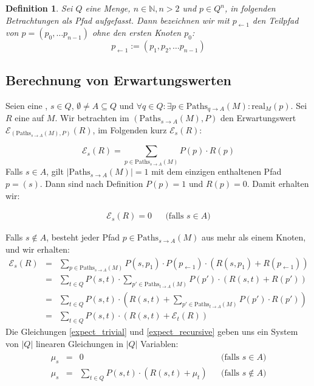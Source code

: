 \documentclass[a4paper]{article}
\newtheorem{definition}[satz]{Definition} %
\theoremstyle{nonumberplain}
\begin{document}
\begin{definition}
	Sei $Q$ eine Menge, $n\in \mathbb{N}, n>2$ und $p \in Q^n$, in folgenden Betrachtungen als Pfad aufgefasst. Dann bezeichnen wir mit $p_{\leftarrow 1}$ den Teilpfad von $p = (p_0, \dots p_{n-1})$ ohne den ersten Knoten $p_0$:
	\begin{equation}
		p_{\leftarrow 1} := (p_1,p_2, \dots p_{n-1})
	\end{equation}
\end{definition}

\subsection{Berechnung von Erwartungswerten}

Seien \mcex{} eine \mc{}, $s \in Q$, $\emptyset \neq A \subseteq Q$ und $\forall q \in Q: \exists p \in \mathrm{Paths}_{q \rightarrow A}(M) : \mathrm{real}_{M}(p)$. Sei $R$ eine  \reward{} auf $M$. Wir betrachten im \probspace{} $(\mathrm{Paths}_{s \rightarrow A}(M), P)$ den Erwartungswert $\mathcal{E}_{(\mathrm{Paths}_{s \rightarrow A}(M), P)}(R)$, im Folgenden kurz $\mathcal{E}_{s}(R)$:

\begin{equation}
	\mathcal{E}_{s}(R) = \sum_{p \in \mathrm{Paths}_{s \rightarrow A}(M)}{P(p) \cdot R(p)} 
\end{equation}
Falls $s \in A$, gilt $|\mathrm{Paths}_{s \rightarrow A}(M)| = 1$ mit dem einzigen enthaltenen Pfad $p = (s)$. Dann sind nach Definition $P(p) = 1$ und $R(p) = 0$. Damit erhalten wir:

\begin{align}
	\mathcal{E}_{s}(R) = 0 && \text{(falls $s \in A$)}\label{expect_trivial}
\end{align}

Falls $s \notin A$, besteht jeder Pfad $p \in \mathrm{Paths}_{s \rightarrow A}(M)$ aus mehr als einem Knoten, und wir erhalten:
\begin{align}
	\mathcal{E}_{s}(R) & = & \sum_{p \in \mathrm{Paths}_{s \rightarrow A}(M)}{P(s,p_1) \cdot P(p_{\leftarrow 1}) \cdot (R(s,p_1) + R(p_{\leftarrow 1}))} \\
	& = & \sum_{t \in Q}{ P(s,t) \cdot \sum_{p' \in \mathrm{Paths}_{t \rightarrow A}(M)}{ P(p') \cdot (R(s,t) + R(p')) } } \\
	& = & \sum_{t \in Q}{ P(s,t) \cdot \left(R(s,t) + \sum_{p' \in \mathrm{Paths}_{t \rightarrow A}(M)}{ P(p') \cdot R(p') } \right) } \\
	& = & \sum_{t \in Q}{ P(s,t) \cdot \left(R(s,t) + \mathcal{E}_{t}(R) \right) } \label{expect_recursive}
\end{align}
Die Gleichungen \ref{expect_trivial} und \ref{expect_recursive} geben uns ein System von $|Q|$ linearen Gleichungen in $|Q|$ Variablen:
\begin{align}
\begin{aligned}
	\mu_{s} & = & 0 && \text{(falls $s \in A$)} \\
	\mu_{s} & = & \sum_{t \in Q}{ P(s,t) \cdot \left(R(s,t) + \mu_{t} \right) } && \text{(falls $s \notin A$)}
\end{aligned}\label{les-exp}
\end{align}
\end{document}
